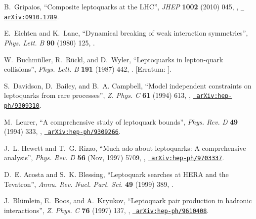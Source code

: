 \documentclass[12pt]{thesis}  %
\begin{document}
\begin{thebibliography}{100}
\hrefCMSnoop {} {B.~Gripaios, ``{Composite leptoquarks at the LHC}'',} \textit{
  JHEP} \textbf{ 1002} (2010) 045,
  \href{http://dx.doi.org/10.1007/JHEP02(2010)045}{},
\href{http://www.arXiv.org/abs/0910.1789}{\texttt{ arXiv:0910.1789}}.

\hrefCMSnoop {} {E.~Eichten and K.~Lane, ``Dynamical breaking of weak
  interaction symmetries'',} \textit{ Phys. Lett. B} \textbf{ 90} (1980) 125,
  \href{http://dx.doi.org/10.1016/0370-2693(80)90065-9}{}.

\hrefCMSnoop {} {W.~Buchm{\"u}ller, R.~R{\"u}ckl, and D.~Wyler, ``{Leptoquarks
  in lepton-quark collisions}'',} \textit{ Phys. Lett. B} \textbf{ 191} (1987)
  442,
  \href{http://dx.doi.org/10.1016/0370-2693(87)90637-X}{}.
  [Erratum:
  \href{http://dx.doi.org/10.1016/S0370-2693(99)00014-3}{}].

\hrefCMSnoop {} {S.~Davidson, D.~Bailey, and B.~A. Campbell, ``Model
  independent constraints on leptoquarks from rare processes'',} \textit{ Z.
  Phys. C} \textbf{ 61} (1994) 613,
  \href{http://dx.doi.org/10.1007/BF01552629}{},
  \href{http://www.arXiv.org/abs/hep-ph/9309310}{\texttt{
  arXiv:hep-ph/9309310}}.

\hrefCMSnoop {} {M.~Leurer, ``A comprehensive study of leptoquark bounds'',}
  \textit{ Phys. Rev. D} \textbf{ 49} (1994) 333,
  \href{http://dx.doi.org/10.1103/PhysRevD.49.333}{},
\href{http://www.arXiv.org/abs/hep-ph/9309266}{\texttt{ arXiv:hep-ph/9309266}}.

\hrefCMSnoop {} {J.~L. Hewett and T.~G. Rizzo, ``Much ado about leptoquarks: A
  comprehensive analysis'',} \textit{ Phys. Rev. D} \textbf{ 56} (Nov, 1997)
  5709,
  \href{http://dx.doi.org/10.1103/PhysRevD.56.5709}{},
  \href{http://www.arXiv.org/abs/hep-ph/9703337}{\texttt{
  arXiv:hep-ph/9703337}}.

\hrefCMSnoop {} {D.~E. Acosta and S.~K. Blessing, ``Leptoquark searches at HERA
  and the Tevatron'',} \textit{ Annu. Rev. Nucl. Part. Sci.} \textbf{ 49}
  (1999) 389,
  \href{http://dx.doi.org/10.1146/annurev.nucl.49.1.389}{}.

\hrefCMSnoop {} {J.~Bl{\"u}mlein, E.~Boos, and A.~Kryukov, ``Leptoquark pair
  production in hadronic interactions'',} \textit{ Z. Phys. C} \textbf{ 76}
  (1997) 137,
  \href{http://dx.doi.org/10.1007/s002880050538}{},
  \href{http://www.arXiv.org/abs/hep-ph/9610408}{\texttt{
  arXiv:hep-ph/9610408}}.


\end{thebibliography}
\end{document}
